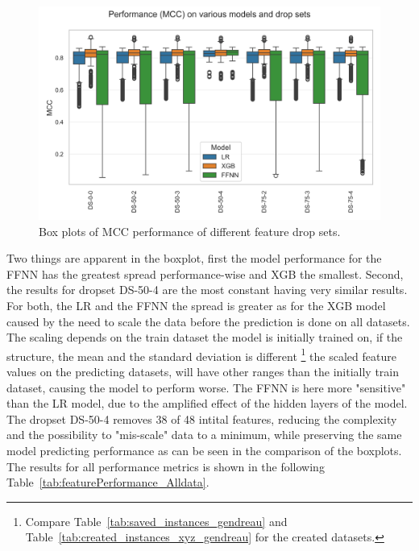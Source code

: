 \begin{figure}[ht]
    \centering
    \includegraphics[width = .95\textwidth]{pictures/feature_filter/all_data_exceptSubsets_box_plot.png}
    \caption{Box plots of MCC performance of different feature drop sets.}
    \label{fig:mcc_filter_results}
\end{figure}
Two things are apparent in the boxplot, first the model performance for the \gls{FFNN} has the greatest spread performance-wise and
XGB the smallest. Second, the results for dropset DS-50-4 are the most constant having very similar results. For both, the \gls{LR} and
the \gls{FFNN} the spread is greater as for the XGB model caused by the need to scale the data before the prediction is done on all datasets.
The scaling depends on the train dataset the model is initially trained on, if the structure, the mean and the standard deviation is
different \footnote{Compare Table~\ref{tab:saved_instances_gendreau} and Table~\ref{tab:created_instances_xyz_gendreau} for the created datasets.}
the scaled feature values on the predicting datasets, will have other ranges than the initially train dataset, causing the model to perform worse.
The \gls{FFNN} is here more "sensitive" than the \gls{LR} model, due to the amplified effect of the hidden layers of the model. The dropset
DS-50-4 removes 38 of 48 intital features, reducing the complexity and the possibility to "mis-scale" data to a minimum, while preserving
the same model predicting performance as can be seen in the comparison of the boxplots. The results for all performance metrics is shown in
the following Table~\ref{tab:featurePerformance_Alldata}.

